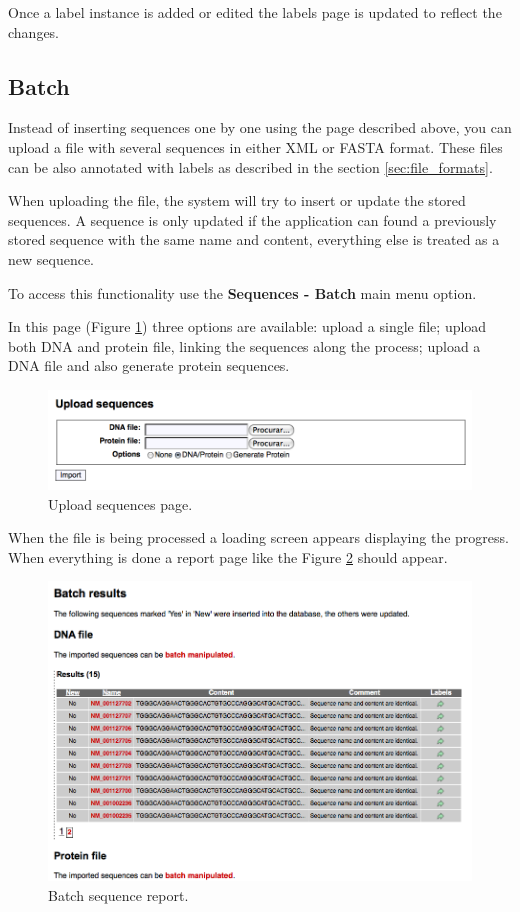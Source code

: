 Once a label instance is added or edited the labels page is updated to reflect the changes.

\subsection{Batch}

Instead of inserting sequences one by one using the page described above, you can
upload a file with several sequences in either XML or FASTA format. These files
can be also annotated with labels as described in the section \ref{sec:file_formats}.

When uploading the file, the system will try to insert or update the stored sequences.
A sequence is only updated if the application can found a previously stored sequence with
the same name and content, everything else is treated as a new sequence.

To access this functionality use the \textbf{Sequences - Batch} main menu option.

In this page (Figure \ref{fig:sequence_upload2}) three options are available: upload a single file; upload both DNA and protein file, linking
the sequences along the process; upload a DNA file and also generate protein sequences.

\begin{figure}[ht]
  \centering
    \includegraphics[scale=0.5]{sequence_upload.png}
  \caption{Upload sequences page.}
  \label{fig:sequence_upload2}
\end{figure}

When the file is being processed a loading screen appears displaying the progress.
When everything is done a report page like the Figure \ref{fig:batch_report2} should appear.

\begin{figure}[ht]
  \centering
    \includegraphics[scale=0.5]{batch_report2.png}
  \caption{Batch sequence report.}
  \label{fig:batch_report2}
\end{figure}


